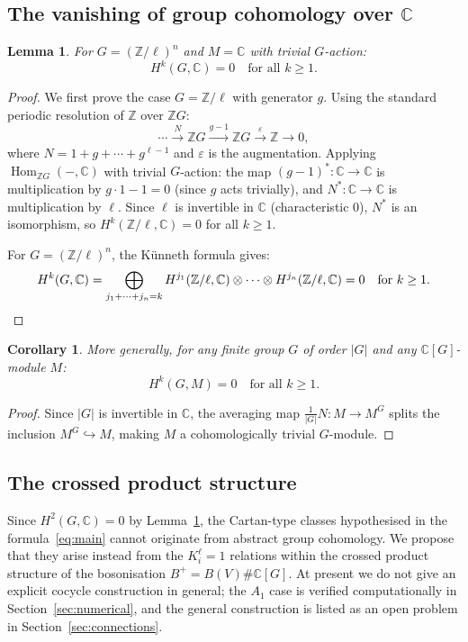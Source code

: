 \documentclass[11pt,letterpaper]{amsart}
\theoremstyle{plain}
\newtheorem{lemma}[theorem]{Lemma}
\newtheorem{corollary}[theorem]{Corollary}
\theoremstyle{definition}
\theoremstyle{remark}
\newcommand{\CC}{\mathbb{C}}
\newcommand{\ZZ}{\mathbb{Z}}
\newcommand{\bplus}{B^{+}}
\begin{document}
\subsection{The vanishing of group cohomology over $\CC$}

\begin{lemma}
\label{lem:maschke}
For $G = (\ZZ/\ell)^n$ and $M = \CC$ with trivial $G$-action:
\[
H^k(G, \CC) = 0 \quad \text{for all } k \geq 1.
\]
\end{lemma}

\begin{proof}
We first prove the case $G = \ZZ/\ell$ with generator $g$. Using the standard periodic resolution of $\ZZ$ over $\ZZ G$:
\[
\cdots \xrightarrow{N} \ZZ G \xrightarrow{g-1} \ZZ G \xrightarrow{\varepsilon} \ZZ \to 0,
\]
where $N = 1 + g + \cdots + g^{\ell-1}$ and $\varepsilon$ is the augmentation. Applying $\operatorname{Hom}_{\ZZ G}(-, \CC)$ with trivial $G$-action: the map $(g-1)^* \colon \CC \to \CC$ is multiplication by $g \cdot 1 - 1 = 0$ (since $g$ acts trivially), and $N^* \colon \CC \to \CC$ is multiplication by $\ell$. Since $\ell$ is invertible in $\CC$ (characteristic $0$), $N^*$ is an isomorphism, so $H^k(\ZZ/\ell, \CC) = 0$ for all $k \geq 1$.

For $G = (\ZZ/\ell)^n$, the K\"unneth formula gives:
\[
H^k(G, \CC) = \bigoplus_{j_1+\cdots+j_n = k} H^{j_1}(\ZZ/\ell, \CC) \otimes \cdots \otimes H^{j_n}(\ZZ/\ell, \CC) = 0 \quad \text{for } k \geq 1. \qedhere
\]
\end{proof}

\begin{corollary}
\label{cor:maschke}
More generally, for any finite group $G$ of order $|G|$ and any $\CC[G]$-module $M$:
\[
H^k(G, M) = 0 \quad \text{for all } k \geq 1.
\]
\end{corollary}

\begin{proof}
Since $|G|$ is invertible in $\CC$, the averaging map $\frac{1}{|G|}N \colon M \to M^G$ splits the inclusion $M^G \hookrightarrow M$, making $M$ a cohomologically trivial $G$-module.
\end{proof}

\subsection{The crossed product structure}

Since $H^2(G, \CC) = 0$ by Lemma~\ref{lem:maschke}, the Cartan-type classes hypothesised in the formula~\eqref{eq:main} cannot originate from abstract group cohomology. We propose that they arise instead from the $K_i^\ell = 1$ relations within the crossed product structure of the bosonisation $\bplus = B(V) \# \CC[G]$. At present we do not give an explicit cocycle construction in general; the $A_1$ case is verified computationally in Section~\ref{sec:numerical}, and the general construction is listed as an open problem in Section~\ref{sec:connections}.
\end{document}
